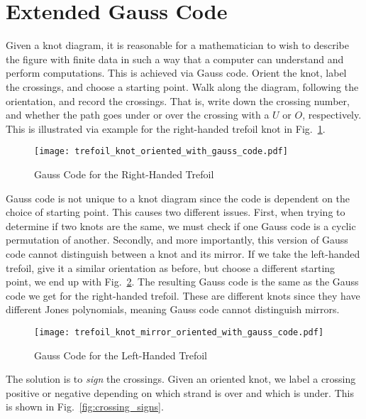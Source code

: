 \documentclass{article}
\theoremstyle{plain}
\begin{document}
    \section{Extended Gauss Code}
        Given a knot diagram, it is reasonable for a mathematician to wish to
        describe the figure with finite data in such a way that a computer can
        understand and perform computations. This is achieved via Gauss code.
        Orient the knot, label the crossings, and choose a starting point.
        Walk along the diagram, following the orientation, and record the
        crossings. That is, write down the crossing number, and whether the
        path goes under or over the crossing with a $U$ or $O$,
        respectively. This is illustrated via example for the right-handed
        trefoil knot in Fig.~\ref{fig:right_handed_trefoil_gauss_code}.
        \begin{figure}
            \centering
            \texttt{[image: trefoil\_knot\_oriented\_with\_gauss\_code.pdf]}
            \caption{Gauss Code for the Right-Handed Trefoil}
            \label{fig:right_handed_trefoil_gauss_code}
        \end{figure}
        Gauss code is not unique to a knot diagram since the code is dependent
        on the choice of starting point. This causes two different issues.
        First, when trying to determine if two knots are the same, we must
        check if one Gauss code is a cyclic permutation of another. Secondly,
        and more importantly, this version of Gauss code cannot distinguish
        between a knot and its mirror. If we take the left-handed trefoil,
        give it a similar orientation as before, but choose a different
        starting point, we end up with
        Fig.~\ref{fig:left_handed_trefoil_gauss_code}. The resulting Gauss code
        is the same as the Gauss code we get for the right-handed trefoil.
        These are different knots since they have different Jones polynomials,
        meaning Gauss code cannot distinguish mirrors.
        \begin{figure}
            \centering
            \texttt{[image: trefoil\_knot\_mirror\_oriented\_with\_gauss\_code.pdf]}
            \caption{Gauss Code for the Left-Handed Trefoil}
            \label{fig:left_handed_trefoil_gauss_code}
        \end{figure}
        The solution is to \textit{sign} the crossings. Given an oriented knot,
        we label a crossing positive or negative depending on which strand is
        over and which is under. This is shown in Fig.~\ref{fig:crossing_signs}.
\end{document}
